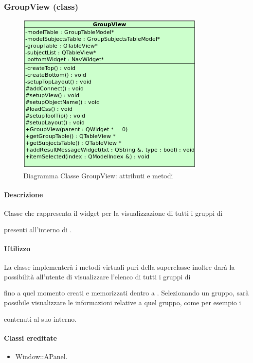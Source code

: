 \subsubsection{GroupView (class)}
\label{spegroV}
\begin{figure}[!h]
\centering
			\includegraphics[width=0.5\linewidth]{./Content/Immagini/view/GroupView.png}
			\caption{Diagramma Classe GroupView: attributi e metodi}
			\label{cl_groview}
\end{figure}
\paragraph{Descrizione \\}
Classe che rappresenta il widget per la visualizzazione di tutti i gruppi di \subject{} presenti all'interno di \project.
\paragraph{Utilizzo\\}
La classe implementerà i metodi virtuali puri della superclasse inoltre darà la possibilità all'utente di visualizzare l'elenco di tutti i gruppi di \subject{} fino a quel momento creati e memorizzati dentro a \project. Selezionando un gruppo, sarà possibile visualizzare le informazioni relative a quel gruppo, come per esempio i \subject{} contenuti al suo interno.
\paragraph{Classi ereditate\\}
\begin{itemize}
\item Window::APanel.
\end{itemize}
